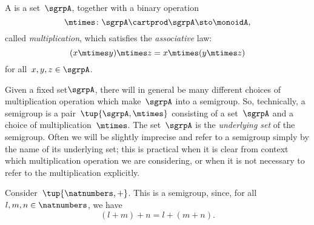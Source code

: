 

\section{}\label{sec:semigroups}


\begin{definition}[Semigroup]
  \label{def:semigroup}
  A \emph{} is a set~$\sgrpA$, together with a binary operation~
  \begin{equation}
    \mtimes \colon \sgrpA \cartprod \sgrpA \sto \monoidA,
  \end{equation}
  called \emph{multiplication}, which satisfies the \emph{associative} law:
    \begin{equation}
      \label{eq:semigroup-associative}
      (x\mtimes y) \mtimes z
      = x\mtimes (y\mtimes z)
    \end{equation}
    for all~$x , y, z \in \sgrpA$.
\end{definition}

\begin{remark}
  Given a fixed set$\sgrpA$, there will in general be many different choices of multiplication operation which make~$\sgrpA$ into a semigroup.
So, technically, a semigroup is a pair~$\tup{\sgrpA, \mtimes}$ consisting of a set~$\sgrpA$ and a choice of multiplication~$\mtimes$.
The set~$\sgrpA$ is the \emph{underlying set} of the semigroup.
Often we will be slightly imprecise and refer to a semigroup simply by the name of its underlying set; this is practical when it is clear from context which multiplication operation we are considering, or when it is not necessary to refer to the multiplication explicitly.
\end{remark}

\begin{example}
\label{natnum-semigroup}
Consider~$\tup{\natnumbers,+}$. This is a semigroup, since, for all~$l,m, n \in \natnumbers$, we have
\begin{equation*}
(l+m) +n
=l+(m+n).
\end{equation*}
\end{example}

